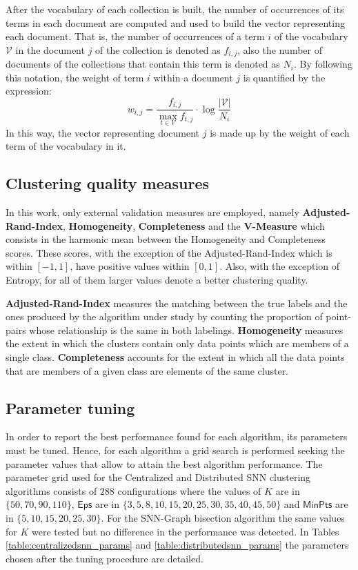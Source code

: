 \documentclass[a4paper]{article}
\begin{document}
After the vocabulary of each collection is built, the number of occurrences of its terms in each document are computed and used to build the vector representing each document. That is, the number of occurrences of a term $i$ of the  vocabulary $\mathcal{V}$ in the document $j$ of the collection is denoted as $f_{i,j}$, also the number of documents of the collections that contain this term is denoted as $N_{i}$. By following this notation, the weight of term $i$ within a document $j$ is quantified by the expression:\[w_{i,j}=\frac{f_{i,j}}{ \operatorname*{max}_{t\in \mathcal{V}}f_{t,j} }\cdot\log\frac{|\mathcal{V}|}{N_{i}}\] In this way, the vector representing document $j$ is made up by the weight of each term of the vocabulary in it.

\subsection*{Clustering quality measures}
In this work, only external validation measures are employed, namely \textbf{Adjusted-Rand-Index}, \textbf{Homogeneity}, \textbf{Completeness} and the \textbf{V-Measure} which consists in the harmonic mean between the Homogeneity and Completeness scores. These scores, with the exception of  the Adjusted-Rand-Index which is within $[-1,1]$,  have positive values within $[0,1]$. Also, with the exception of Entropy, for all of them larger values denote a better clustering quality.

\textbf{Adjusted-Rand-Index} measures the matching between the true labels and the ones produced by the algorithm under study by counting the proportion of point-pairs whose relationship is the same in both labelings. 
\textbf{Homogeneity} measures the extent in which the clusters contain only data points which are members of a single class. 
\textbf{Completeness} accounts for the extent in which all the data points that are members of a given class are elements of the same cluster.


\subsection*{Parameter tuning}
In order to report the best performance found for each algorithm, its parameters must be tuned.
Hence, for each algorithm a grid search is performed seeking the parameter values that allow to attain the best algorithm performance. The parameter grid used for the Centralized and Distributed SNN clustering algorithms consists of $288$ configurations where the values of $K$ are in $\{50, 70, 90, 110\}$, $\mathsf{Eps}$ are in $\{3, 5, 8, 10, 15, 20, 25, 30, 35, 40, 45, 50\}$ and $\mathsf{MinPts}$ are in $\{5, 10, 15, 20, 25, 30\}$. For the SNN-Graph bisection algorithm the same values for $K$ were tested but no difference in the performance was detected. In Tables \ref{table:centralizedsnn_params} and \ref{table:distributedsnn_params} the parameters chosen  after the tuning procedure are detailed.
\end{document}
